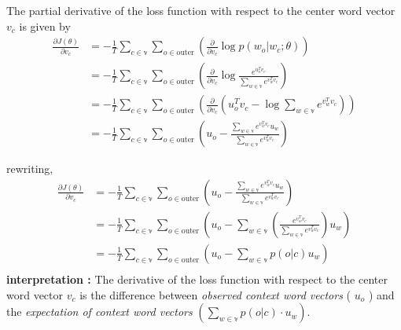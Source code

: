 The partial derivative of the loss function with respect to the center word vector $v_{c}$ is given by
\begin{align*}
    \frac{\partial J(\theta)}{\partial v_{c}} &= - \frac{1}{T} \sum_{c \in \mathbb{v}} \sum_{o \in \text{outer}} \left( \frac{\partial}{\partial v_{c}} \log p(w_o | w_c; \theta) \right) \\
    &= - \frac{1}{T} \sum_{c \in \mathbb{v}} \sum_{o \in \text{outer}} \left( \frac{\partial}{\partial v_{c}} \log \frac{e^{u_o^T v_c}}{\sum_{w \in \mathbb{v}} e^{v_{w}^T v_c}} \right) \\
    &= - \frac{1}{T} \sum_{c \in \mathbb{v}} \sum_{o \in \text{outer}} \left( \frac{\partial}{\partial v_{c}} \left( u_o^T v_c - \log \sum_{w \in \mathbb{v}} e^{v_{w}^T v_c} \right) \right) \\
    &= - \frac{1}{T} \sum_{c \in \mathbb{v}} \sum_{o \in \text{outer}} \left( u_o - \frac{\sum_{w \in \mathbb{v}} e^{v_{w}^T v_c} u_w}{\sum_{w \in \mathbb{v}} e^{v_{w}^T v_c}} \right)
\end{align*}


rewriting, 
\begin{align*}
    \frac{\partial J(\theta)}{\partial v_{c}} &= - \frac{1}{T} \sum_{c \in \mathbb{v}} \sum_{o \in \text{outer}} \left( u_o - \frac{\sum_{w \in \mathbb{v}} e^{v_{w}^T v_c} u_w}{\sum_{w \in \mathbb{v}} e^{v_{w}^T v_c}} \right) \\
    &= - \frac{1}{T} \sum_{c \in \mathbb{v}} \sum_{o \in \text{outer}} \left( u_o - \sum_{w \in \mathbb{v}} \left(\frac{ e^{v_{w}^T v_c} }{\sum_{w \in \mathbb{v}} e^{v_{w}^T v_c}}\right) u_w \right) \\
    &= - \frac{1}{T} \sum_{c \in \mathbb{v}} \sum_{o \in \text{outer}} \left( u_o - \sum_{w \in \mathbb{v}} p(o|c) u_w \right) \\
\end{align*}
{\bf interpretation :} The derivative of the loss function with respect to the center word vector $v_{c}$ is the difference between {\it observed context word vectors} ( $\displaystyle u_o$ ) and the {\it expectation of context word vectors} $\left( \displaystyle \sum_{w \in \mathbb{v}} p(o|c) \cdot u_w \right)$.\\


